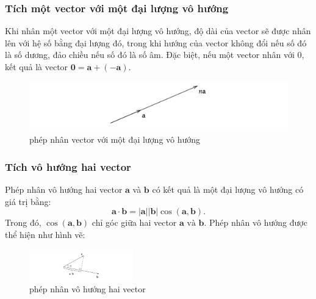 \subsubsection{Tích một vector với một đại lượng vô hướng}
Khi nhân một vector với một đại lượng vô hướng, độ dài của vector sẽ được nhân lên với hệ số bằng đại lượng đó, trong khi hướng của vector không đổi nếu số đó là số dương, đảo chiều nếu số đó là số âm. Đặc biệt, nếu một vector nhân với \(0\), kết quả là vector \(\mathbf{0}=\mathbf{a}+(-\mathbf{a})\).
\begin{figure}[H]
    \centering
    \includegraphics[width=1\textwidth]{Tuan2/Figures/vector x vo huong.png}
    \caption{phép nhân vector với một đại lượng vô hướng}
\end{figure}

\subsubsection{Tích vô hướng hai vector}
Phép nhân vô hướng hai vector \(\mathbf{a}\) và \(\mathbf{b}\) có kết quả là một đại lượng vô hướng có giá trị bằng:
\begin{equation}
    \mathbf{a} \cdot \mathbf{b} = |\mathbf{a}| |\mathbf{b}| \cos (\mathbf{a}, \mathbf{b}).
\end{equation}
Trong đó, \(\cos (\mathbf{a}, \mathbf{b})\) chỉ góc giữa hai vector \(\mathbf{a} \text{ và }\mathbf{b}\).
Phép nhân vô hướng được thể hiện như hình vẽ:
\begin{figure}[H]
    \centering
    \includegraphics[width=0.4\textwidth]{Tuan2/Figures/tichcham.png}
    \caption{phép nhân vô hướng hai vector}
\end{figure}
